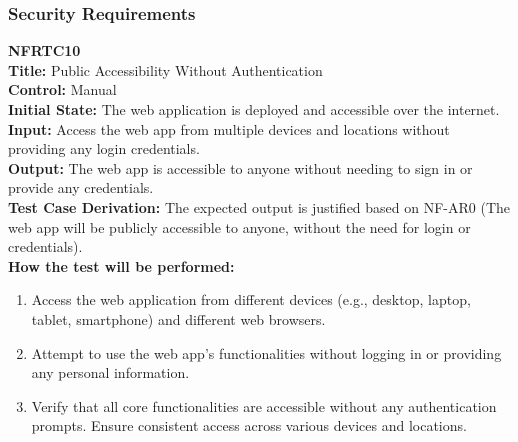 \documentclass[12pt, titlepage]{article}
\begin{document}
\subsubsection{Security Requirements}
\textbf{NFRTC10}\\
\textbf{Title:} Public Accessibility Without Authentication\\
\textbf{Control:} Manual\\
\textbf{Initial State:} The web application is deployed and accessible over the internet.\\
\textbf{Input:} Access the web app from multiple devices and locations without providing any login credentials.\\
\textbf{Output:} The web app is accessible to anyone without needing to sign in or provide any credentials.\\
\textbf{Test Case Derivation:} The expected output is justified based on NF-AR0 (The web app will be publicly accessible to anyone, without the need for login or credentials).\\
\textbf{How the test will be performed:}
\begin{enumerate}
  \item Access the web application from different devices (e.g., desktop, laptop, tablet, smartphone) and different web browsers.
  \item Attempt to use the web app's functionalities without logging in or providing any personal information.
  \item Verify that all core functionalities are accessible without any authentication prompts.
    Ensure consistent access across various devices and locations.
\end{enumerate}
\vspace{1em}
\end{document}
